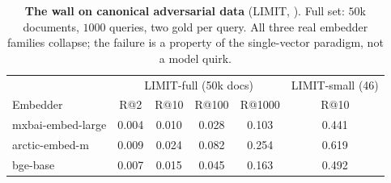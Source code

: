 \documentclass{article}
\begin{document}
\begin{table}[t]
\caption{\textbf{The wall on canonical adversarial data} (LIMIT, \citealp{weller2025limit}).
Full set: $50$k documents, $1000$ queries, two gold per query. All three real embedder families
collapse; the failure is a property of the single-vector paradigm, not a model quirk.}
\label{tab:limit}
\centering\small
\begin{tabular}{@{}lcccc|c@{}}
\toprule
& \multicolumn{4}{c}{LIMIT-full (50k docs)} & LIMIT-small (46)\\
Embedder & R@2 & R@10 & R@100 & R@1000 & R@10\\
\midrule
mxbai-embed-large & 0.004 & 0.010 & 0.028 & 0.103 & 0.441\\
arctic-embed-m    & 0.009 & 0.024 & 0.082 & 0.254 & 0.619\\
bge-base          & 0.007 & 0.015 & 0.045 & 0.163 & 0.492\\
\bottomrule
\end{tabular}
\end{table}
\end{document}
